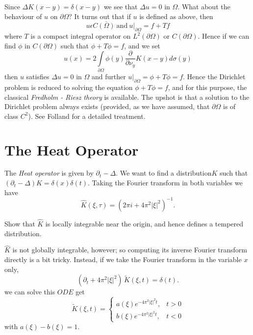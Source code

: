 Since $\Delta K (x-y) = \delta(x-y)$ we see that $\Delta u = 0$ in
$\Omega$. What about the behaviour of $u$ on $\partial \Omega ?$ It
turns out that if $u$ is defined as above, then  
$$
u \epsilon C \bar{(\Omega)} ~\text{and}~ u |_{\partial \Omega} = f + Tf
$$ 
where $T$ is a compact integral operator on $L^2 (\partial \Omega)$ or
$C (\partial \Omega)$. Hence if we can find $\phi$ in $C (\partial
\Omega)$ such that $\phi + T \phi = f$, and we set 
$$
u(x) = 2 \int\limits_{\partial \Omega} \phi(y)
\frac{\partial}{\partial \nu_y} K(x-y) d \sigma (y) 
$$
then $u$ satisfies $\Delta u = 0$ in $\Omega$ and further $u
|_{\partial \Omega} = \phi + T\phi = f$. Hence the Dirichlet problem
is reduced to solving the equation $\phi + T \phi = f$, and for this
purpose, the classical \textit{Fredholm - Riesz theory} is
available. The upshot is that a solution to the Dirichlet problem
always exists (provided, as we have assumed, that $\partial \Omega$ is
of class $C^2$). See Folland \cite{1} for a detailed treatment. 

\section{The Heat Operator}\label{chap2:sec5} %

The \textit{Heat operator} is given by $\partial_t - \Delta$. We want
to find a distribution\pageoriginale $K$ such that $(\partial_t - \Delta) K =
\delta(x) \delta(t)$. Taking the Fourier transform in both variables
we have  
\begin{equation}
  \hat{K}(\xi, \tau) = (2 \pi i + 4 \pi^2
  |\xi|^2)^{-1}. \tag{2.33}\label{chap2:sec5:eq2.33} 
\end{equation}

\begin{exercise}
  Show that $\hat{K}$ is locally integrable near the origin, and hence
  defines a tempered distribution. 
\end{exercise}

$\hat{K}$ is not globally integrable, however; so computing its
inverse Fou\-rier transform directly is a bit tricky. Instead, if we
take the Fourier transform in the variable $x$ only, 
$$
(\partial_t+ 4\pi^2 |\xi|^2)\, \tilde{K}(\xi,t) = \delta(t).
$$
we can solve this $ODE$ get
$$
\tilde{K}(\xi,t) =
\begin{cases}
a(\xi) e^{-4 \pi^2 |\xi|^2 t}, & t>0\\
b(\xi) e^{-4 \pi^2 |\xi|^2 t}, & t<0
\end{cases}
$$
with $a(\xi) - b(\xi) = 1$.

